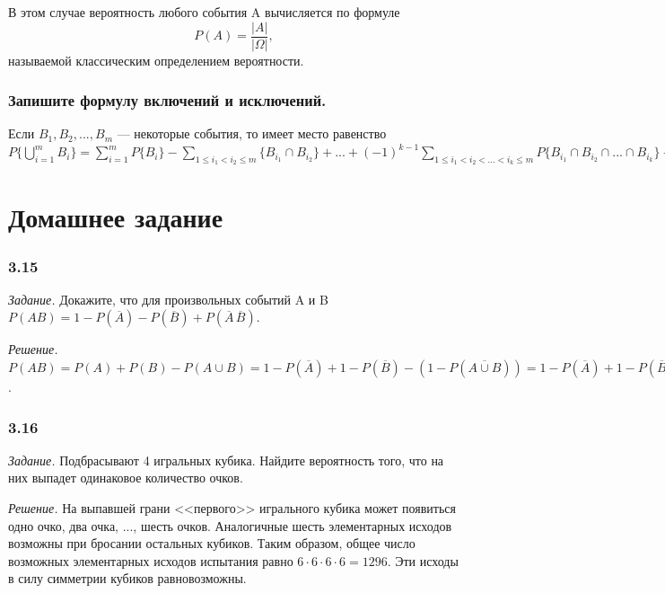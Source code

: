 \documentclass{book}
\begin{document}
В этом случае вероятность любого события A вычисляется по формуле $$P(A)=\frac{|A|}{|\Omega|},$$ называемой классическим определением вероятности.

\subsubsection*{Запишите формулу включений и исключений.}

Если $B_1, B_2, ..., B_m$ --- некоторые события, то имеет место равенство $P\{\bigcup\limits_{i=1}^mB_i\}=\sum\limits_{i=1}^mP\{B_i\}-\sum\limits_{1\leq i_1<i_2\leq m}\{B_{i_1}\cap B_{i_2}\}+...+(-1)^{k-1}\sum\limits_{1\leq i_1<i_2<...<i_k\leq m}P\{B_{i_1}\cap B_{i_2}\cap...\cap B_{i_k}\}+...+(-1)^{m-1}P\{B_1\cap B_2\cap...\cap B_m\}.$

\section*{Домашнее задание}

\subsubsection*{3.15}

\textit{Задание.} Докажите, что для произвольных событий A и B $P(AB)=1-P\left(\overline{A}\right)-P\left(\overline{B}\right)+P\left(\overline{A}\,\overline{B}\right)$.

\textit{Решение.} $P(AB)=P(A)+P(B)-P\left(A\cup B\right)=1-P\left(\overline{A}\right)+1-P\left(\overline{B}\right)-\left(1-P\left(\overline{A\cup B}\right)\right)=1-P\left(\overline{A}\right)+1-P\left(\overline{B}\right)-1+P\left(\overline{A}\,\overline{B}\right)=1-P\left(\overline{A}\right)-P\left(\overline{B}\right)+P\left(\overline{A}\,\overline{B}\right)$.

\subsubsection*{3.16}

\textit{Задание.} Подбрасывают 4 игральных кубика. Найдите вероятность того, что на них выпадет одинаковое количество очков.

\textit{Решение.} На выпавшей грани <<первого>> игрального кубика может появиться одно очко, два очка, ..., шесть очков. Аналогичные шесть элементарных исходов возможны при бросании остальных кубиков. Таким образом, общее число возможных элементарных исходов испытания равно $6\cdot 6\cdot 6\cdot 6=1296$. Эти исходы в силу симметрии кубиков равновозможны.
\end{document}

